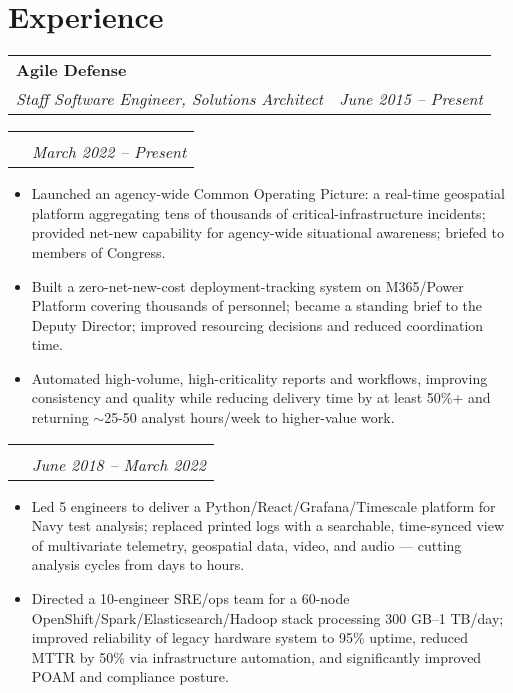 \documentclass[letterpaper,11pt]{article}
\makeatletter
\newcommand{\resumeHeading}[3]{
  \begin{tabular*}{\textwidth}[t]{l@{\extracolsep{\fill}}r}
    \textbf{#1} & \\
    \color{lighter}\interlight\textit{\small#2} & \color{lighter}\interlight\textit{\small#3} \\
  \end{tabular*}
}
\newcommand{\resumeSubSubheading}[3]{
  \vspace{16pt}
  \begin{tabular*}{\textwidth}{l@{\extracolsep{\fill}}r}
    \intersemibold{#1} & \\
    \color{lighter}\interlight{\small#3} & \color{lighter}\interlight\textit{\small #2}\\
  \end{tabular*}
}
\newcommand{\resumeItemListStart}{
\begin{itemize}[leftmargin=20pt]}
\newcommand{\resumeItemListEnd}{
\end{itemize}}
\makeatother
\begin{document}
\section{Experience}

\resumeHeading{Agile Defense}{Staff Software Engineer, Solutions Architect}{June 2015 -- Present}
\vspace{8pt}
\resumeSubSubheading{Solutions Architect}{March 2022 -- Present}{CISA, Integrated Operations Division}
\resumeItemListStart
\item Launched an agency-wide Common Operating Picture: a real-time geospatial platform aggregating tens of thousands of critical-infrastructure incidents; provided net-new capability for agency-wide situational awareness; briefed to members of Congress.
\item Built a zero-net-new-cost deployment-tracking system on M365/Power Platform covering thousands of personnel; became a standing brief to the Deputy Director; improved resourcing decisions and reduced coordination time.
\item Automated high-volume, high-criticality reports and workflows, improving consistency and quality while reducing delivery time by at least 50\%+ and returning $\sim$25-50 analyst hours/week to higher-value work.
\resumeItemListEnd

\resumeSubSubheading{Senior Software Engineer, Project Lead}{June 2018 -- March 2022}{Department of the Navy \& CISA}
\resumeItemListStart
\item Led 5 engineers to deliver a Python/React/Grafana/Timescale platform for Navy test analysis; replaced printed logs with a searchable, time-synced view of multivariate telemetry, geospatial data, video, and audio --- cutting analysis cycles from days to hours.
\item Directed a 10-engineer SRE/ops team for a 60-node OpenShift/Spark/Elasticsearch/Hadoop stack processing 300 GB--1 TB/day; improved reliability of legacy hardware system to 95\% uptime, reduced MTTR by 50\% via infrastructure automation, and significantly improved POAM and compliance posture.
\resumeItemListEnd
\end{document}
